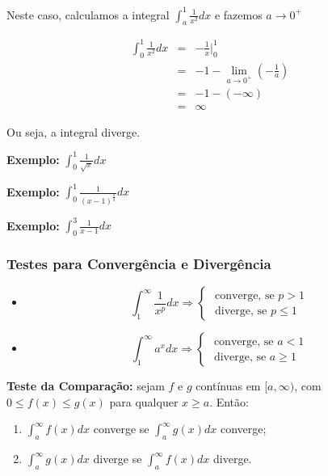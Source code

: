 \documentclass[oneside,a4paper,12pt]{article}
\begin{document}
Neste caso, calculamos a integral $\int_{a}^{1}\frac{1}{x^2}dx$ e fazemos $a \rightarrow 0^{+}$

\begin{eqnarray*}
\int_{0}^{1}\frac{1}{x^2}dx & = & - \frac{1}{x}|_{0}^{1} \\
& = & -1 - \lim\limits_{a \rightarrow 0^{+}} \left( - \frac{1}{a} \right) \\
& = & -1 - (- \infty) \\
& = & \infty
\end{eqnarray*}

Ou seja, a integral diverge.

{\bf Exemplo:} $\int_{0}^{1}\frac{1}{\sqrt{x}}dx$

\vspace{180pt}

{\bf Exemplo:} $\int_{0}^{1}\frac{1}{(x-1)^{\frac{2}{3}}}dx$
\vspace{180pt}

{\bf Exemplo:} $\int_{0}^{3}\frac{1}{x-1}dx$
\vspace{350pt}

\subsubsection{Testes para Convergência e Divergência}
\begin{itemize}
	\item $$\int_{1}^{\infty}\frac{1}{x^p}dx \Rightarrow \begin{cases}
		\text{ converge, se }p > 1 \\
		\text{ diverge, se } p \leq 1
	\end{cases}$$
	\item $$ \int_{1}^{\infty}a^x dx \Rightarrow \begin{cases}
	\text{ converge, se } a < 1 \\
	\text{ diverge, se } a \geq 1
	\end{cases}$$
\end{itemize}

{\bf Teste da Comparação:} sejam $f$ e $g$ contínuas em $[a,\infty)$, com $0 \leq f(x) \leq g(x) $ para qualquer $x \geq a$. Então:
\begin{enumerate}
	\item $\int_{a}^{\infty}f(x)dx$ converge se $\int_{a}^{\infty}g(x)dx$ converge;
	\item $\int_{a}^{\infty}g(x)dx$ diverge se $\int_{a}^{\infty}f(x)dx$ diverge.
\end{enumerate}
\end{document}
